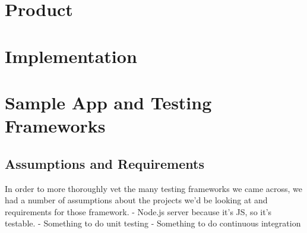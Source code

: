 \documentclass[11pt]{article}
\begin{document}


\section{Product}


\section{Implementation}


\section{Sample App and Testing Frameworks}

\subsection{Assumptions and Requirements}
In order to more thoroughly vet the many testing frameworks we came across, we had a number of assumptions about the projects we'd be looking at and requirements for those framework.
- Node.js server because it's JS, so it's testable.
- Something to do unit testing
- Something to do continuous integration
\end{document}
